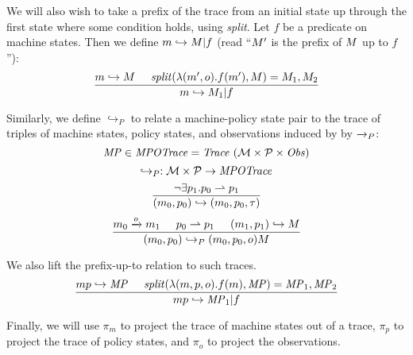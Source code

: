 \documentclass[acmsmall,review,anonymous]{acmart}\settopmatter{printfolios=true,printccs=false,printacmref=false}
\begin{document}
We will also wish to take a prefix of the trace from an initial state up through the first state where
some condition holds, using {\it split}. Let \(f\) be a predicate on machine states. Then we define
\(m \hookrightarrow M | f\) (read ``\(M'\) is the prefix of \(M\) up to \(f\)''):
  \[\frac{m \hookrightarrow M \hspace{.5cm} \mathit{split}(\lambda (m',o).f(m'),M)
            = M_1,M_2}
         {m \hookrightarrow M_1 | f}\]

Similarly, we define \(\hookrightarrow_P\) to relate a machine-policy
state pair to the trace of triples of machine states, policy states,
and observations induced by by \(\xrightarrow{}_P\):
%
  \[\MPT \in \mathit{MPOTrace} = \mathit{Trace}\ (\MACHS \times \POLS \times \OBSS)\]
  \[\hookrightarrow_P : {\mathcal M} \times \mathcal{P} \rightarrow \mathit{MPOTrace}\]
  \[\frac{\neg \exists p_1 . p_0 \rightharpoonup p_1}
         {(m_0,p_0) \hookrightarrow (m_0,p_0,\tau)}\]
  \[\frac{m_0 \xrightarrow{o} m_1 \hspace{.5cm} p_0 \rightharpoonup p_1 \hspace{.5cm}
            (m_1,p_1) \hookrightarrow M}
         {(m_0,p_0) \hookrightarrow_P (m_0,p_0,o) M}\]

We also lift the prefix-up-to relation to such traces.
  \[\frac{mp \hookrightarrow \mathit{MP} \hspace{.5cm}
            \mathit{split}(\lambda (m,p,o).f(m),\mathit{MP}) = \mathit{MP}_1,\mathit{MP}_2}
         {mp \hookrightarrow \mathit{MP}_1 | f}\]

Finally, we will use \(\pi_m\) to project the trace of machine states
out of a trace, \(\pi_p\) to project the trace of policy states, and
\(\pi_o\) to project the observations.

\end{document}
